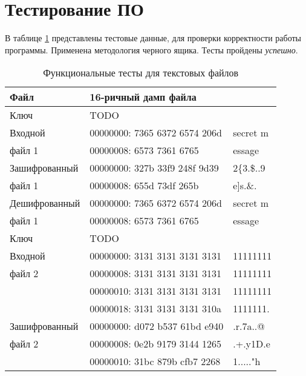 \section{Тестирование ПО}

В таблице \ref{tbl:tests} представлены тестовые данные, для проверки корректности работы программы.
Применена методология черного ящика. Тесты пройдены \textit{успешно}.

\begin{table}[ht!]
	\begin{center}
		\caption{Функциональные тесты для текстовых файлов}
        \label{tbl:tests}
		\begin{tabular}{|l|ll|}
            \hline
            Файл & 16-ричный дамп файла & \\
			\hline
			\hline
            Ключ          & TODO & \\
            \hline
            Входной       & 00000000: 7365 6372 6574 206d & secret m \\
            файл 1        & 00000008: 6573 7361 6765      & essage \\
			\hline
            Зашифрованный & 00000000: 327b 33f9 248f 9d39 & 2\{3.\$..9 \\
            файл 1        & 00000008: 655d 73df 265b      & e]s.\&. \\
            \hline
            Дешифрованный & 00000000: 7365 6372 6574 206d & secret m \\
            файл 1        & 00000008: 6573 7361 6765      & essage \\
			\hline
            \hline
            Ключ          & TODO & \\
            \hline
            Входной       & 00000000: 3131 3131 3131 3131 & 11111111 \\
            файл 2        & 00000008: 3131 3131 3131 3131 & 11111111 \\
                          & 00000010: 3131 3131 3131 3131 & 11111111 \\
                          & 00000018: 3131 3131 3131 310a & 1111111. \\
			\hline
            Зашифрованный & 00000000: d072 b537 61bd e940 & .r.7a..@ \\
            файл 2        & 00000008: 0e2b 9179 3144 1265 & .+.y1D.e \\
                          & 00000010: 31bc 879b cfb7 2268 & 1....."h \\

\end{tabular}
\end{center}
\end{table}
